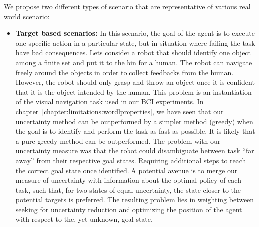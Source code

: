 
We propose two different types of scenario that are representative of various real world scenario: 
\begin{itemize}
\item \textbf{Target based scenarios:} In this scenario, the goal of the agent is to execute one specific action in a particular state, but in situation where failing the task have bad consequences. 
Lets consider a robot that should identify one object among a finite set and put it to the bin for a human. The robot can navigate freely around the objects in order to collect feedbacks from the human. However, the robot should only grasp and throw an object once it is confident that it is the object intended by the human. 
This problem is an instantiation of the visual navigation task used in our BCI experiments. In chapter~\ref{chapter:limitations:wordlproperties}, we have seen that our uncertainty method can be outperformed by a simpler method (greedy) when the goal is to identify and perform the task as fast as possible. It is likely that a pure greedy method can be outperformed. The problem with our uncertainty measure was that the robot could disambiguate between task ``far away'' from their respective goal states. Requiring additional steps to reach the correct goal state once identified. A potential avenue is to merge our measure of uncertainty with information about the optimal policy of each task, such that, for two states of equal uncertainty, the state closer to the potential targets is preferred. The resulting problem lies in weighting between seeking for uncertainty reduction and optimizing the position of the agent with respect to the, yet unknown, goal state.



\end{itemize}
